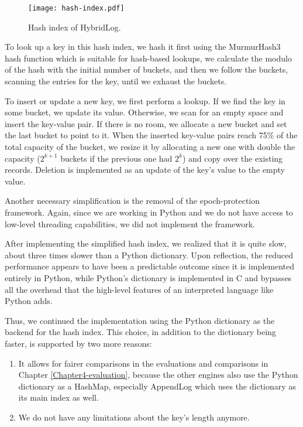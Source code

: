 \vspace{20px}
\begin{figure}[h]
    \centering
    \texttt{[image: hash-index.pdf]}
    \caption{Hash index of HybridLog.}
    \label{fig:hash-index}
\end{figure}
\vspace{20px}

To look up a key in this hash index, we hash it first using the MurmurHash3 hash function which is suitable for hash-based lookups, we calculate the modulo of the hash with the initial number of buckets, and then we follow the buckets, scanning the entries for the key, until we exhaust the buckets.

To insert or update a new key, we first perform a lookup. If we find the key in some bucket, we update its value. Otherwise, we scan for an empty space and insert the key-value pair. If there is no room, we allocate a new bucket and set the last bucket to point to it. When the inserted key-value pairs reach 75\% of the total capacity of the bucket, we resize it by allocating a new one with double the capacity ($2^{k+1}$ buckets if the previous one had $2^{k}$) and copy over the existing records. Deletion is implemented as an update of the key's value to the empty value.

Another necessary simplification is the removal of the epoch-protection framework. Again, since we are working in Python and we do not have access to low-level threading capabilities, we did not implement the framework.

After implementing the simplified hash index, we realized that it is quite slow, about three times slower than a Python dictionary. Upon reflection, the reduced performance appears to have been a predictable outcome since it is implemented entirely in Python, while Python's dictionary is implemented in C and bypasses all the overhead that the high-level features of an interpreted language like Python adds.

Thus, we continued the implementation using the Python dictionary as the backend for the hash index. This choice, in addition to the dictionary being faster, is supported by two more reasons:
\begin{enumerate}
    \item It allows for fairer comparisons in the evaluations and comparisons in Chapter \ref{Chapter4-evaluation}, because the other engines also use the Python dictionary as a HashMap, especially AppendLog which uses the dictionary as its main index as well.
    \item We do not have any limitations about the key's length anymore.
\end{enumerate}

